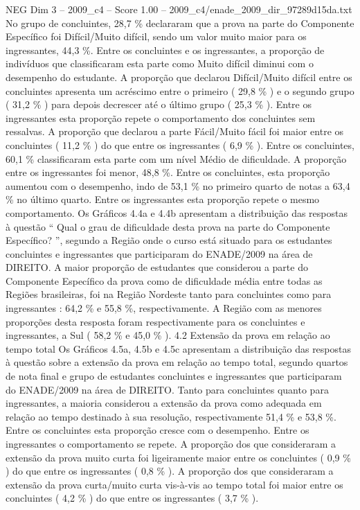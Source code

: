 \begin{textsample}{NEG Dim 3 – 2009\_c4 – Score 1.00 – 2009\_c4/enade\_2009\_dir\_97289d15da.txt}
No grupo de concluintes, 28,7 \% declararam que a prova na parte do Componente Específico foi Difícil/Muito difícil, sendo um valor muito maior para os ingressantes, 44,3 \%.
Entre os concluintes e os ingressantes, a proporção de indivíduos que classificaram esta parte como Muito difícil diminui com o desempenho do estudante.
A proporção que declarou Difícil/Muito difícil entre os concluintes apresenta um acréscimo entre o primeiro ( 29,8 \% ) e o segundo grupo ( 31,2 \% ) para depois decrescer até o último grupo ( 25,3 \% ).
Entre os ingressantes esta proporção repete o comportamento dos concluintes sem ressalvas.
A proporção que declarou a parte Fácil/Muito fácil foi maior entre os concluintes ( 11,2 \% ) do que entre os ingressantes ( 6,9 \% ).
Entre os concluintes, 60,1 \% classificaram esta parte com um nível Médio de dificuldade.
A proporção entre os ingressantes foi menor, 48,8 \%.
Entre os concluintes, esta proporção aumentou com o desempenho, indo de 53,1 \% no primeiro quarto de notas a 63,4 \% no último quarto.
Entre os ingressantes esta proporção repete o mesmo comportamento.
Os Gráficos 4.4a e 4.4b apresentam a distribuição das respostas à questão “ Qual o grau de dificuldade desta prova na parte do Componente Específico? ”, segundo a Região onde o curso está situado para os estudantes concluintes e ingressantes que participaram do ENADE/2009 na área de DIREITO.
A maior proporção de estudantes que considerou a parte do Componente Específico da prova como de dificuldade média entre todas as Regiões brasileiras, foi na Região Nordeste tanto para concluintes como para ingressantes : 64,2 \% e 55,8 \%, respectivamente.
A Região com as menores proporções desta resposta foram respectivamente para os concluintes e ingressantes, a Sul ( 58,2 \% e 45,0 \% ). 4.2 Extensão da prova em relação ao tempo total Os Gráficos 4.5a, 4.5b e 4.5c apresentam a distribuição das respostas à questão sobre a extensão da prova em relação ao tempo total, segundo quartos de nota final e grupo de estudantes concluintes e ingressantes que participaram do ENADE/2009 na área de DIREITO.
Tanto para concluintes quanto para ingressantes, a maioria considerou a extensão da prova como adequada em relação ao tempo destinado à sua resolução, respectivamente 51,4 \% e 53,8 \%.
Entre os concluintes esta proporção cresce com o desempenho.
Entre os ingressantes o comportamento se repete.
A proporção dos que consideraram a extensão da prova muito curta foi ligeiramente maior entre os concluintes ( 0,9 \% ) do que entre os ingressantes ( 0,8 \% ).
A proporção dos que consideraram a extensão da prova curta/muito curta vis-à-vis ao tempo total foi maior entre os concluintes ( 4,2 \% ) do que entre os ingressantes ( 3,7 \% ).

\end{textsample}
